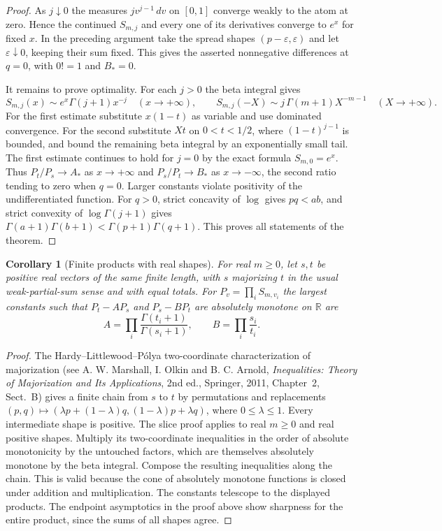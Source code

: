\documentclass[11pt,a4paper]{article}
\newtheorem{corollary}[theorem]{Corollary}
\numberwithin{equation}{section}
\begin{document}
\begin{proof}
As $j\downarrow0$ the measures $jv^{j-1}\,dv$ on $[0,1]$
converge weakly to the atom at zero. Hence the continued $S_{m,j}$
and every one of its derivatives converge to $e^x$ for fixed $x$.
In the preceding argument take the spread shapes $(p-\varepsilon,
\varepsilon)$ and let $\varepsilon\downarrow0$, keeping their sum
fixed. This gives the asserted nonnegative differences at $q=0$,
with $0!=1$ and $B_*=0$.

It remains to prove optimality. For each $j>0$ the beta integral gives
\[
 S_{m,j}(x)\sim e^x\Gamma(j+1)x^{-j}\quad (x\to+\infty),
 \qquad S_{m,j}(-X)\sim j\,\Gamma(m+1)X^{-m-1}
       \quad(X\to+\infty).
\]
For the first estimate substitute $x(1-t)$ as variable and use
dominated convergence. For the second substitute $Xt$ on $0<t<1/2$,
where $(1-t)^{j-1}$ is bounded, and bound the remaining beta integral
by an exponentially small tail. The first estimate continues to hold
for $j=0$ by the exact formula $S_{m,0}=e^x$.
Thus $P_t/P_s\to A_*$ as $x\to+\infty$ and
$P_s/P_t\to B_*$ as $x\to-\infty$, the second ratio tending to zero
when $q=0$. Larger constants violate positivity of the undifferentiated
function. For $q>0$, strict concavity of $\log$ gives $pq<ab$,
and strict convexity of $\log\Gamma(j+1)$ gives
$\Gamma(a+1)\Gamma(b+1)<\Gamma(p+1)\Gamma(q+1)$.
This proves all statements of the theorem.
\end{proof}

\begin{corollary}[Finite products with real shapes]\label{hq:finite}
For real $m\ge0$, let $s,t$ be positive real vectors of the same finite
length, with $s$ majorizing $t$ in the usual weak-partial-sum sense
and with equal totals. For $P_v=\prod_i S_{m,v_i}$ the largest
constants such that $P_t-A P_s$ and $P_s-B P_t$ are absolutely
monotone on $\mathbb R$ are
\[
 A=\prod_i\frac{\Gamma(t_i+1)}{\Gamma(s_i+1)},
 \qquad B=\prod_i\frac{s_i}{t_i}.
\]
\end{corollary}
\begin{proof}
The Hardy--Littlewood--P\'olya two-coordinate characterization of
majorization (see A. W. Marshall, I. Olkin and B. C. Arnold,
\emph{Inequalities: Theory of Majorization and Its Applications},
2nd ed., Springer, 2011, Chapter~2, Sect.~B) gives a finite chain
from $s$ to $t$ by permutations and replacements
$(p,q)\mapsto(\lambda p+(1-\lambda)q,(1-\lambda)p+\lambda q)$,
where $0\le\lambda\le1$. Every intermediate shape is positive.
The slice proof applies to real $m\ge0$ and real positive shapes.
Multiply its two-coordinate inequalities in the order of absolute
monotonicity by the untouched factors, which are themselves
absolutely monotone by the beta integral. Compose the resulting
inequalities along the chain. This is valid because the cone of
absolutely monotone functions is closed under addition and
multiplication. The constants telescope to the displayed products.
The endpoint asymptotics in the proof above show sharpness for the
entire product, since the sums of all shapes agree.
\end{proof}
\end{document}
